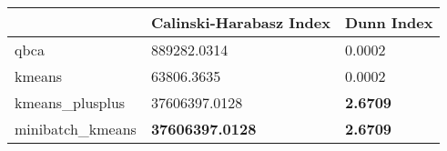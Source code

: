 \begin{table}[htbp]
\centering
\begin{tabular}{lll}
\toprule
 & Calinski-Harabasz Index & Dunn Index \\
\midrule
qbca & 889282.0314 & 0.0002 \\
kmeans & 63806.3635 & 0.0002 \\
kmeans_plusplus & 37606397.0128 & \textbf{2.6709} \\
minibatch_kmeans & \textbf{37606397.0128} & \textbf{2.6709} \\
\bottomrule
\end{tabular}
\end{table}
